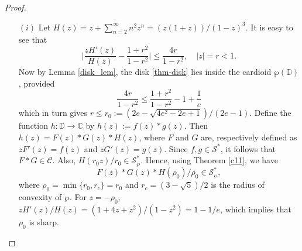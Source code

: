 \documentclass[12pt, reqno]{amsart}
\numberwithin{equation}{section}
\theoremstyle{plain}
\theoremstyle{definition}
\theoremstyle{remark}
\begin{document}
\begin{proof}
	\begin{itemize}\label{disk}
		\item [$(i)$] Let $H(z)=z+\sum_{n=2}^{\infty}n^2z^n=(z(1+z))/(1-z)^3$. It is easy to see that 
		\begin{equation}\label{thm-disk}
		\biggl|\frac{zH'(z)}{H(z)} -\frac{1+r^2}{1-r^2}\biggl| \leq \frac{4r}{1-r^2}, \quad |z|=r<1. 
		\end{equation}
		Now by Lemma \ref{disk_lem}, the disk \eqref{thm-disk}  lies inside the cardioid $\wp(\mathbb{D})$, provided 
		$$\frac{4r}{1-r^2} \leq \frac{1+r^2}{1-r^2}-1+\frac{1}{e} $$  
		which in turn gives $ r\leq r_0:= (2e-\sqrt{4e^2-2e+1})/(2e-1).$  Define the function $h:\mathbb{D} \rightarrow \mathbb{C}$  by $h(z):=f(z)*g(z)$. Then $h(z)=F(z)*G(z)*H(z)$, where $F$ and $G$ are, respectively defined as $zF'(z)=f(z)$  and $zG'(z)=g(z)$. Since $f, g\in \mathcal{S}^*$, it follows that $F*G\in \mathcal{C}$. Also, $H(r_0 z)/r_0 \in \mathcal{S}^*_{\wp}$. Hence, using Theorem \ref{c11}, we have
		$${F(z)*G(z)*H(\rho_0)}/{\rho_0} \in \mathcal{S}^*_{\wp},$$
		where  $\rho_0=\min\{r_0, r_c\}=r_0$ and $r_c=(3-\sqrt{5})/2$  is the radius of convexity of $\wp$. For $z=-\rho_0$, $zH'(z)/H(z)=(1+4z+z^2)/(1-z^2)=1-1/e$, which implies that $\rho_0$ is sharp. 
		

\end{itemize}
\end{proof}
\end{document}
